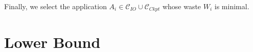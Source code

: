 \documentclass[conference]{IEEEtran}
\newcommand{\muind}{\mu_{\text{ind}}}
\newcommand{\period}[1]{P_{#1}}
\newcommand{\wap}[1]{W_{#1}}
\newcommand{\IOcat}{\textsc{IO-Candidate}\xspace}
\newcommand{\Ckptcat}{\textsc{Ckpt-Candidate}\xspace}
\newcommand{\Catiocat}{\mathcal{C}_{IO}\xspace}
\newcommand{\Catckptcat}{\mathcal{C}_{Ckpt}\xspace}
\begin{document}
 Finally, we select the application $A_{i} \in \Catiocat \cup \Catckptcat$ whose waste
 $\wap{i}$ is minimal.


%
%
%
%

\section{Lower Bound}\label{sec:lowerbound}
\end{document}
